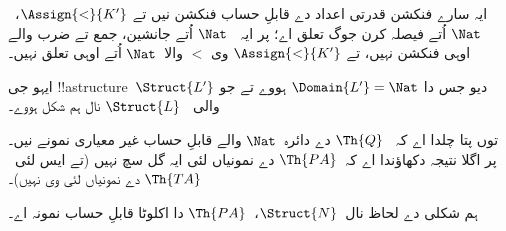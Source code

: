 \documentclass[../../../include/open-logic-section]{subfiles}
\begin{document}
\begin{ex}
ایہ سارے فنکشن قدرتی اعداد دے قابلِ حساب
فنکشن نیں تے $\Assign{<}{K'}$،~$\Nat$
اُتے فیصلہ کرن جوگ تعلق اے؛ پر ایہ
~$\Nat$ اُتے جانشین، جمع تے ضرب والے اوہی
فنکشن نہیں، تے $\Assign{<}{K'}$ وی
$<$ والا~$\Nat$ اُتے اوہی تعلق نہیں۔
\end{ex}

\begin{prob}
ایہو جی !!a{structure}~$\Struct{L'}$ دیو جس دا
$\Domain{L'} = \Nat$ ہووے تے جو
 والی
~$\Struct{L}$ نال ہم شکل ہووے۔
\end{prob}

\begin{explain}
 توں پتا چلدا اے کہ
~$\Th{Q}$ دے دائرہ~$\Nat$ والے قابلِ حساب
غیر معیاری نمونے نیں۔ پر اگلا نتیجہ دکھاؤندا
اے کہ~$\Th{PA}$ دے نمونیاں لئی ایہ گل سچ
نہیں (تے ایس لئی~$\Th{TA}$ دے نمونیاں لئی وی نہیں)۔
\end{explain}

\begin{thm}
ہم شکلی دے لحاظ نال~$\Struct{N}$،~$\Th{PA}$ دا اکلوٹا قابلِ حساب
نمونہ اے۔
\end{thm}
\end{document}
